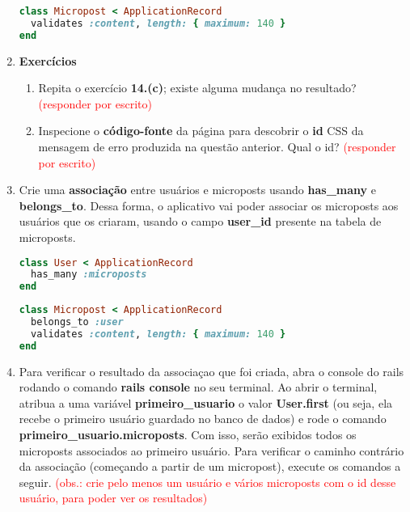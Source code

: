 \documentclass[a4paper,12pt]{article}
\begin{document}
\begin{enumerate}
    \begin{lstlisting}[language=Ruby, title=app/models/micropost.rb]
class Micropost < ApplicationRecord
  validates :content, length: { maximum: 140 }
end
    \end{lstlisting}

  \item \textbf{Exercícios}

    \begin{enumerate}
      \item Repita o exercício \textbf{14.(c)}; existe alguma mudança no resultado? \textcolor{red}{(responder por escrito)}
      \item Inspecione o \textbf{código-fonte} da página para descobrir o \textbf{id} CSS da mensagem de erro produzida na questão anterior. Qual o id? \textcolor{red}{(responder por escrito)}
    \end{enumerate}

  \item Crie uma \textbf{associação} entre usuários e microposts usando \textbf{has\_many} e \textbf{belongs\_to}. Dessa forma, o aplicativo vai poder associar os microposts aos usuários que os criaram, usando o campo \textbf{user\_id} presente na tabela de microposts.

    \begin{lstlisting}[language=Ruby, title=app/models/user.rb]
class User < ApplicationRecord
  has_many :microposts
end
    \end{lstlisting}

    \begin{lstlisting}[language=Ruby, title=app/models/micropost.rb]
class Micropost < ApplicationRecord
  belongs_to :user
  validates :content, length: { maximum: 140 }
end
    \end{lstlisting}

  \item Para verificar o resultado da associaçao que foi criada, abra o console do rails rodando o comando \textbf{rails console} no seu terminal. Ao abrir o terminal, atribua a uma variável \textbf{primeiro\_usuario} o valor \textbf{User.first} (ou seja, ela recebe o primeiro usuário guardado no banco de dados) e rode o comando \textbf{primeiro\_usuario.microposts}. Com isso, serão exibidos todos os microposts associados ao primeiro usuário. Para verificar o caminho contrário da associação (começando a partir de um micropost), execute os comandos a seguir. \textcolor{red}{(obs.: crie pelo menos um usuário e vários microposts com o id desse usuário, para poder ver os resultados)}


\end{enumerate}
\end{document}
